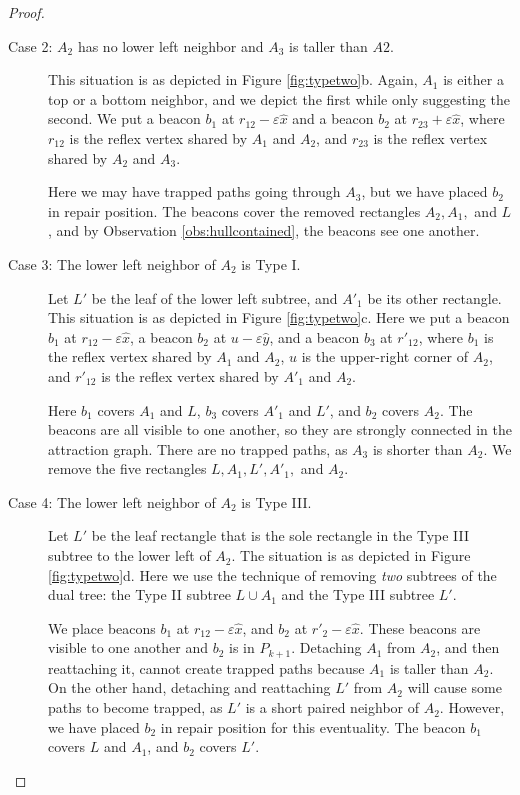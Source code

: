 \documentclass{article}
\begin{document}
\begin{proof}
\begin{description}
			\item[Case 2: $A_2$ has no lower left neighbor and $A_3$ is taller than
			$A2$.] 
			
				This situation is as depicted in Figure \ref{fig:typetwo}b. 
				Again, $A_1$ is either a top or a bottom neighbor, and we depict the first
				while only suggesting the second.
				We put a beacon $b_1$ at $r_{12} - \varepsilon\hat{x}$ and a
				beacon $b_2$ at $r_{23} + \varepsilon\hat{x}$, where $r_{12}$ is the reflex
				vertex shared by $A_1$ and $A_2$, and $r_{23}$ is the reflex
				vertex shared by $A_2$ and $A_3$.
				
				Here we may have trapped paths going through $A_3$, but we have placed $b_2$
				in repair position.  The beacons cover the removed rectangles $A_2, A_1,$ and
				$L$, and by Observation \ref{obs:hullcontained}, the beacons see one
				another.
			
			\item[Case 3: The lower left neighbor of $A_2$ is Type I.] 
					
				Let $L'$ be the leaf of the lower left subtree, and $A'_1$ be its other
				rectangle.  This situation is as depicted in Figure \ref{fig:typetwo}c.
				Here we put a beacon $b_1$ at $r_{12} - \varepsilon\hat{x}$, a beacon $b_2$
				at $u - \varepsilon\hat{y}$, and a beacon $b_3$ at $r'_{12}$, where $b_1$ is
				the reflex vertex shared by $A_1$ and $A_2$, $u$ is the upper-right corner
				of $A_2$, and $r'_{12}$ is the reflex vertex shared by $A'_1$ and $A_2$.
				
				Here $b_1$ covers $A_1$ and $L$, $b_3$ covers $A'_1$ and $L'$, and $b_2$
				covers $A_2$.  The beacons are all visible to one another, so they are
				strongly connected in the attraction graph.  There are no trapped paths, as
				$A_3$ is shorter than $A_2$.  We remove the five rectangles $L, A_1, L', A'_1,$ and 
				$A_2$.
				
			
			\item[Case 4: The lower left neighbor of $A_2$ is Type III.] 	
			
				Let $L'$ be the leaf rectangle that is the sole rectangle in the Type III
				subtree to the lower left of $A_2$.  The situation is as depicted in Figure
				\ref{fig:typetwo}d.
				Here we use the technique of removing \emph{two} subtrees of the dual tree:
				the Type II subtree $L \cup A_1$ and the Type III subtree $L'$.
				
				We place beacons $b_1$ at $r_{12} - \varepsilon\hat{x}$, and $b_2$ at
				$r'_{2} - \varepsilon\hat{x}$.  These beacons are visible to one another and
				$b_2$ is in $P_{k+1}$.  Detaching $A_1$ from $A_2$, and then reattaching it,
				cannot create trapped paths because $A_1$ is taller than $A_2$.
				On the other hand, detaching and reattaching $L'$ from $A_2$ will cause some
				paths to become trapped, as $L'$ is a short paired neighbor of $A_2$.
				However, we have placed $b_2$ in repair position for this eventuality.
				The beacon $b_1$ covers $L$ and $A_1$, and $b_2$ covers $L'$.
			\end{description}
			

\end{proof}
\end{document}
